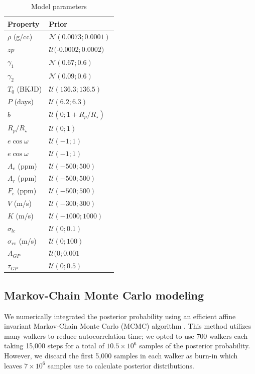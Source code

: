 \documentclass[apjl]{emulateapj}
\begin{document}
\begin{table}
\centering
\caption{Model parameters}\label{tab:priors}
\begin{tabular}{l l }
Property & Prior \\
\hline
$\rho$ (g/cc)		&	$\mathcal{N}(0.0073;0.0001)$ \\
$zp$				& 	$\mathcal{U}($-$0.0002;0.0002)$\\
$\gamma_1$		&	$\mathcal{N}(0.67;0.6)$ \\
$\gamma_2$		&	$\mathcal{N}(0.09;0.6)$\\
$T_0$ (BKJD)& $\mathcal{U}(136.3;136.5)$\\
$P$ (days) & $\mathcal{U}(6.2;6.3)$\\
$b$ & $\mathcal{U}(0;1+R_{p}/R_{\star})$\\
$R_{p}/R_{\star}$ & $\mathcal{U}(0;1)$ \\
$e\cos{\omega}$ &$\mathcal{U}(-1;1)$ \\
$e\cos{\omega}$ & $\mathcal{U}(-1;1)$\\
$A_e$ (ppm)&$\mathcal{U}(-500;500)$ \\
$A_r$ (ppm)& $\mathcal{U}(-500;500)$\\
$F_e$ (ppm)& $\mathcal{U}(-500;500)$\\
$V$ (m/s)&$\mathcal{U}(-300;300)$ \\
$K$ (m/s)&$\mathcal{U}(-1000;1000)$ \\
$\sigma_{lc}$ & $\mathcal{U}(0;0.1)$\\
$\sigma_{rv}$ (m/s)&$\mathcal{U}(0;100)$ \\
$A_{GP}$ &  $\mathcal{U}(0;0.001$ \\
$\tau_{GP}$ &  $\mathcal{U}(0;0.5)$ \\
\hline
\end{tabular}
\end{table}

\subsection{Markov-Chain Monte Carlo modeling}
We numerically integrated the posterior probability using an efficient affine invariant Markov-Chain Monte Carlo (MCMC) algorithm \citep{goodman10,foreman13}.  This method utilizes many walkers to reduce autocorrelation time; we opted to use 700 walkers each taking 15,000 steps for a total of $10.5\times10^6$ samples of the posterior probability. However, we discard the first 5,000 samples in each walker as burn-in which leaves $7\times10^6$ samples use to calculate posterior distributions.
\end{document}
